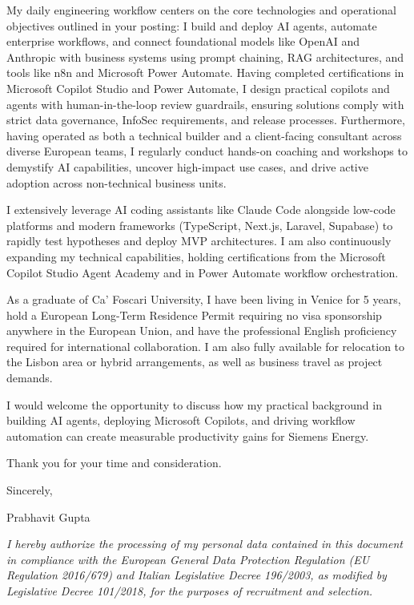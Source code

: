 \documentclass[10pt,a4paper]{article}
\begin{document}
My daily engineering workflow centers on the core technologies and operational objectives outlined in your posting: I build and deploy AI agents, automate enterprise workflows, and connect foundational models like OpenAI and Anthropic with business systems using prompt chaining, RAG architectures, and tools like n8n and Microsoft Power Automate. Having completed certifications in Microsoft Copilot Studio and Power Automate, I design practical copilots and agents with human-in-the-loop review guardrails, ensuring solutions comply with strict data governance, InfoSec requirements, and release processes. Furthermore, having operated as both a technical builder and a client-facing consultant across diverse European teams, I regularly conduct hands-on coaching and workshops to demystify AI capabilities, uncover high-impact use cases, and drive active adoption across non-technical business units.

I extensively leverage AI coding assistants like Claude Code alongside low-code platforms and modern frameworks (TypeScript, Next.js, Laravel, Supabase) to rapidly test hypotheses and deploy MVP architectures. I am also continuously expanding my technical capabilities, holding certifications from the Microsoft Copilot Studio Agent Academy and in Power Automate workflow orchestration.

As a graduate of Ca' Foscari University, I have been living in Venice for 5 years, hold a European Long-Term Residence Permit requiring no visa sponsorship anywhere in the European Union, and have the professional English proficiency required for international collaboration. I am also fully available for relocation to the Lisbon area or hybrid arrangements, as well as business travel as project demands.

I would welcome the opportunity to discuss how my practical background in building AI agents, deploying Microsoft Copilots, and driving workflow automation can create measurable productivity gains for Siemens Energy.

\vspace{4pt}
Thank you for your time and consideration.

Sincerely,

\vspace{4pt}
Prabhavit Gupta

\vfill
\noindent\textit{\footnotesize I hereby authorize the processing of my personal data contained in this document in compliance with the European General Data Protection Regulation (EU Regulation 2016/679) and Italian Legislative Decree 196/2003, as modified by Legislative Decree 101/2018, for the purposes of recruitment and selection.}
\end{document}
